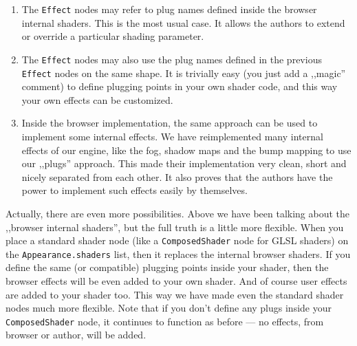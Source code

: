 \documentclass{acmsiggraph}                     %
\begin{document}
\begin{enumerate}

\item The \texttt{Effect} nodes may refer to plug names
defined inside the browser internal shaders. This is the most usual case.
It allows the authors to extend or override a particular shading parameter.

\item The \texttt{Effect} nodes may also use the plug names defined
in the previous \texttt{Effect} nodes on the same shape.
It is trivially easy (you just add a ,,magic'' comment) to define
plugging points in your own shader code, and this way your own effects
can be customized.

\item Inside the browser implementation, the same approach can be used
to implement some internal effects.
We have reimplemented many internal effects of our engine,
like the fog, shadow maps and the bump mapping to use our ,,plugs'' approach.
This made their implementation very clean, short
and nicely separated from each other. It also proves that
the authors have the power to implement such effects easily by themselves.



\end{enumerate}

Actually, there are even more possibilities.
Above we have been talking about the ,,browser internal shaders'',
but the full truth is a little more flexible.
When you place a standard shader node
(like a \texttt{ComposedShader} node for GLSL shaders) on the
\texttt{Appearance.shaders} list,
then it replaces the internal browser shaders.
If you define the same (or compatible) plugging points inside your shader,
then the browser effects will be even added to your own
shader. And of course user effects are added to your shader too.
This way we have made even the standard shader nodes much more flexible.
Note that if you don't define any plugs inside your \texttt{ComposedShader} node,
it continues to function as before --- no effects, from browser or author,
will be added.
\end{document}
